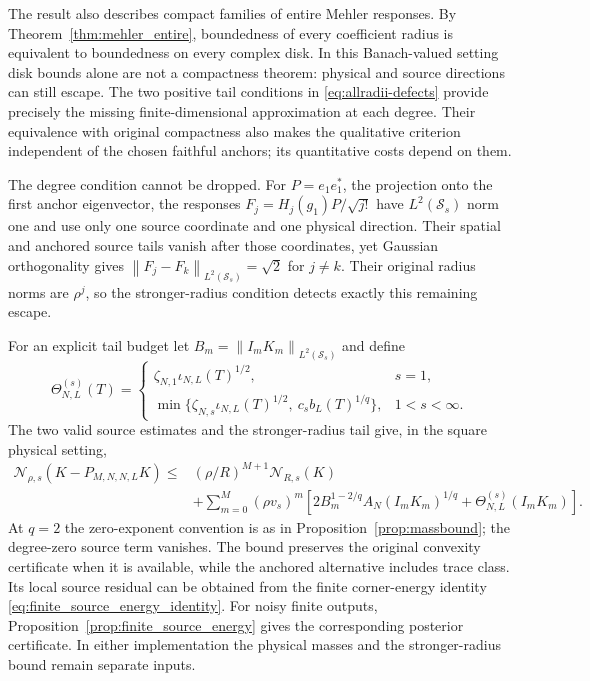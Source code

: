 \documentclass[11pt,a4paper]{amsart}
\numberwithin{equation}{section}
\theoremstyle{definition}
\theoremstyle{remark}
\newcommand{\Sch}{\mathcal S}
\newcommand{\norm}[1]{\left\lVert#1\right\rVert}
\newcommand{\Nn}[2]{\mathcal N_{#1,s}(#2)}
\begin{document}
The result also describes compact families of entire Mehler responses. By Theorem~\ref{thm:mehler_entire}, boundedness of every coefficient radius is equivalent to boundedness on every complex disk. In this Banach-valued setting disk bounds alone are not a compactness theorem: physical and source directions can still escape. The two positive tail conditions in \eqref{eq:allradii-defects} provide precisely the missing finite-dimensional approximation at each degree. Their equivalence with original compactness also makes the qualitative criterion independent of the chosen faithful anchors; its quantitative costs depend on them.

The degree condition cannot be dropped. For $P=e_1e_1^*$, the projection onto the first anchor eigenvector, the responses
$F_j=H_j(g_1)P/\sqrt{j!}$ have $L^2(\Sch_s)$ norm one and use only one source coordinate and one physical direction. Their spatial and anchored source tails vanish after those coordinates, yet Gaussian orthogonality gives $\norm{F_j-F_k}_{L^2(\Sch_s)}=\sqrt2$ for $j\ne k$. Their original radius norms are $\rho^j$, so the stronger-radius condition detects exactly this remaining escape.

For an explicit tail budget let $B_m=\norm{I_mK_m}_{L^2(\Sch_s)}$ and define
\begin{equation}\label{eq:hybrid_source_budget}
 \Theta_{N,L}^{(s)}(T)=
 \begin{cases}
  \zeta_{N,1}\iota_{N,L}(T)^{1/2},&s=1,\\
  \min\{\zeta_{N,s}\iota_{N,L}(T)^{1/2},\ c_sb_L(T)^{1/q}\},&1<s<\infty.
 \end{cases}
\end{equation}
The two valid source estimates and the stronger-radius tail give, in the square physical setting,
\begin{equation}\label{eq:certifiedfulltail}
 \begin{split}
 \Nn\rho{K-P_{M,N,N,L}K}\le{}&
 (\rho/R)^{M+1}\Nn R K\\
 &+\sum_{m=0}^M(\rho v_s)^m
 \left[2B_m^{1-2/q}A_N(I_mK_m)^{1/q}
              +\Theta_{N,L}^{(s)}(I_mK_m)\right].
 \end{split}
\end{equation}
At $q=2$ the zero-exponent convention is as in Proposition~\ref{prop:massbound}; the degree-zero source term vanishes. The bound preserves the original convexity certificate when it is available, while the anchored alternative includes trace class. Its local source residual can be obtained from the finite corner-energy identity \eqref{eq:finite_source_energy_identity}. For noisy finite outputs, Proposition~\ref{prop:finite_source_energy} gives the corresponding posterior certificate. In either implementation the physical masses and the stronger-radius bound remain separate inputs.
\end{document}
